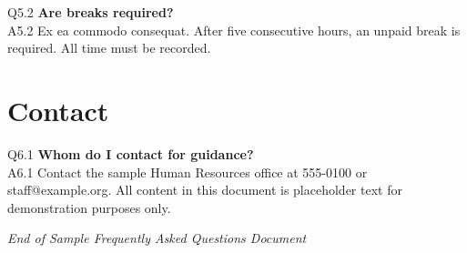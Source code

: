 \documentclass[11pt,a4paper,oneside]{article}
\begin{document}
\noindent Q5.2 \textbf{Are breaks required?}\\
\noindent A5.2 Ex ea commodo consequat. After five consecutive hours, an unpaid break is required. All time must be recorded.\vspace{6pt}

\section{Contact}
\noindent Q6.1 \textbf{Whom do I contact for guidance?}\\
\noindent A6.1 Contact the sample Human Resources office at 555-0100 or staff@example.org. All content in this document is placeholder text for demonstration purposes only.\vspace{6pt}

\vspace{1cm}

\noindent\hrulefill

\noindent\textit{End of Sample Frequently Asked Questions Document}
\end{document}
